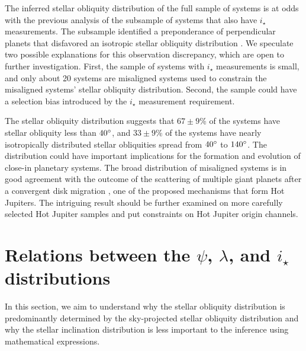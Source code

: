 \documentclass[twocolumn,times]{aastex631}
\begin{document}
The inferred stellar obliquity distribution of the full sample of systems is at odds with the previous analysis of the subsample of systems that also have $i_\star$ measurements. The subsample identified a preponderance of perpendicular planets that disfavored an isotropic stellar obliquity distribution \citep{Albrecht21}. We speculate two possible explanations for this observation discrepancy, which are open to further investigation.
First, the sample of systems with $i_\star$ measurements is small, and only about 20 systems are misaligned systems used to constrain the misaligned systems' stellar obliquity distribution. Second, the sample could have a selection bias introduced by the $i_\star$ measurement requirement.

The stellar obliquity distribution suggests that $67\pm9$\% of the systems have stellar obliquity less than $40\mbox{$^\circ$}$, and $33\pm9$\% of the systems have nearly isotropically distributed stellar obliquities spread from $40\mbox{$^\circ$}$ to $140\mbox{$^\circ$}$. The distribution could have important implications for the formation and evolution of close-in planetary systems.
The broad distribution of misaligned systems is in good agreement with the outcome of the scattering of multiple giant planets after a convergent disk migration \citep[e.g.,][]{Nagasawa11, Beague12}, one of the proposed mechanisms that form Hot Jupiters. The intriguing result should be further examined on more carefully selected Hot Jupiter samples and put constraints on Hot Jupiter origin channels.

\section{Relations between the $\psi$, $\lambda$, and \lowercase{$i_\star$} distributions}\label{sec:jacobian}

In this section, we aim to understand why the stellar obliquity distribution is predominantly determined by the sky-projected stellar obliquity distribution and why the stellar inclination distribution is less important to the inference using mathematical expressions.
\end{document}
